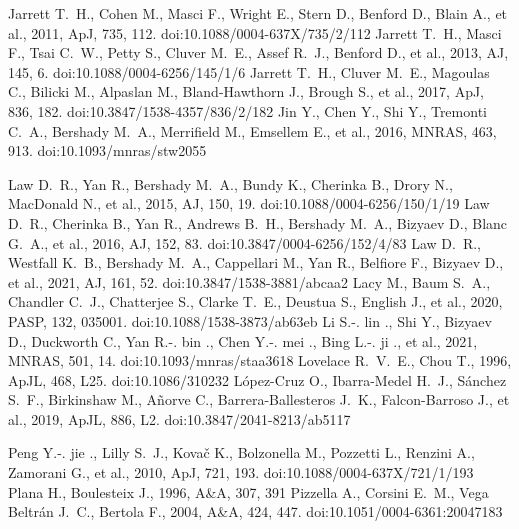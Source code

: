 \documentclass[fleqn,usenatbib]{mnras}
\begin{document}
\begin{thebibliography}{}
 Jarrett T.~H., Cohen M., Masci F., Wright E., Stern D., Benford D., Blain A., et al., 2011, ApJ, 735, 112. doi:10.1088/0004-637X/735/2/112
 Jarrett T.~H., Masci F., Tsai C.~W., Petty S., Cluver M.~E., Assef R.~J., Benford D., et al., 2013, AJ, 145, 6. doi:10.1088/0004-6256/145/1/6
 Jarrett T.~H., Cluver M.~E., Magoulas C., Bilicki M., Alpaslan M., Bland-Hawthorn J., Brough S., et al., 2017, ApJ, 836, 182. doi:10.3847/1538-4357/836/2/182
 Jin Y., Chen Y., Shi Y., Tremonti C.~A., Bershady M.~A., Merrifield M., Emsellem E., et al., 2016, MNRAS, 463, 913. doi:10.1093/mnras/stw2055

 Law D.~R., Yan R., Bershady M.~A., Bundy K., Cherinka B., Drory N., MacDonald N., et al., 2015, AJ, 150, 19. doi:10.1088/0004-6256/150/1/19
 Law D.~R., Cherinka B., Yan R., Andrews B.~H., Bershady M.~A., Bizyaev D., Blanc G.~A., et al., 2016, AJ, 152, 83. doi:10.3847/0004-6256/152/4/83
 Law D.~R., Westfall K.~B., Bershady M.~A., Cappellari M., Yan R., Belfiore F., Bizyaev D., et al., 2021, AJ, 161, 52. doi:10.3847/1538-3881/abcaa2
 Lacy M., Baum S.~A., Chandler C.~J., Chatterjee S., Clarke T.~E., Deustua S., English J., et al., 2020, PASP, 132, 035001. doi:10.1088/1538-3873/ab63eb
 Li S.-. lin ., Shi Y., Bizyaev D., Duckworth C., Yan R.-. bin ., Chen Y.-. mei ., Bing L.-. ji ., et al., 2021, MNRAS, 501, 14. doi:10.1093/mnras/staa3618
 Lovelace R.~V.~E., Chou T., 1996, ApJL, 468, L25. doi:10.1086/310232
 L{\'o}pez-Cruz O., Ibarra-Medel H.~J., S{\'a}nchez S.~F., Birkinshaw M., A{\~n}orve C., Barrera-Ballesteros J.~K., Falcon-Barroso J., et al., 2019, ApJL, 886, L2. doi:10.3847/2041-8213/ab5117

 Peng Y.-. jie ., Lilly S.~J., Kova{\v{c}} K., Bolzonella M., Pozzetti L., Renzini A., Zamorani G., et al., 2010, ApJ, 721, 193. doi:10.1088/0004-637X/721/1/193
 Plana H., Boulesteix J., 1996, A\&A, 307, 391
 Pizzella A., Corsini E.~M., Vega Beltr{\'a}n J.~C., Bertola F., 2004, A\&A, 424, 447. doi:10.1051/0004-6361:20047183


\end{thebibliography}
\end{document}
